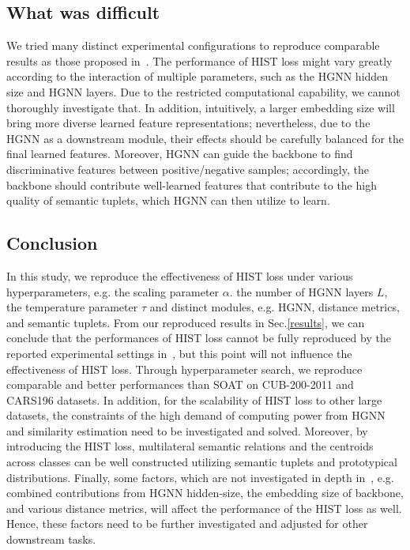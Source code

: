 \subsection{What was difficult}
We tried many distinct experimental configurations to reproduce comparable results as those proposed in~\cite{lim2022hypergraph}. The performance of HIST loss might vary greatly according to the interaction of multiple parameters, such as the HGNN hidden size and HGNN layers. Due to the restricted computational capability, we cannot thoroughly investigate that. In addition, intuitively, a larger embedding size will bring more diverse learned feature representations;  nevertheless, due to the HGNN as a downstream module, their effects should be carefully balanced for the final learned features. Moreover, HGNN can guide the backbone to find discriminative features between positive/negative samples; accordingly, the backbone should contribute well-learned features that contribute to the high quality of semantic tuplets, which HGNN can then utilize to learn.

\subsection{Conclusion}
In this study, we reproduce the effectiveness of HIST loss under various hyperparameters, e.g. the scaling parameter $\alpha$. the number of HGNN layers $L$, the temperature parameter $\tau$ and distinct modules, e.g. HGNN, distance metrics, and semantic tuplets. From our reproduced results in Sec.\ref{results}, we can conclude that the performances of HIST loss  cannot be fully reproduced by the reported experimental settings in~\cite{lim2022hypergraph}, but this point will not influence the effectiveness of HIST loss. Through hyperparameter search, we reproduce comparable and better performances than SOAT on CUB-200-2011 and CARS196 datasets. In addition, for the scalability of HIST loss to other large datasets, the constraints of the high demand of computing power from HGNN and similarity estimation need to be investigated and solved. Moreover, by introducing the HIST loss, multilateral semantic relations and the centroids across classes can be well constructed utilizing semantic tuplets and prototypical distributions. Finally, some factors, which are not investigated in depth in~\cite{lim2022hypergraph}, e.g. combined contributions from HGNN hidden-size, the embedding size of backbone, and various distance metrics, will affect the performance of the HIST loss as well. Hence, these factors need to be further investigated and adjusted for other downstream tasks.
